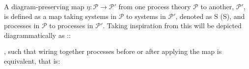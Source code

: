\documentclass[onecolum,aps,groupedaddress,nofootinbib]{revtex4-2}
\begin{document}
A diagram-preserving map \colorbox{PineGreen!20}{$\eta : \mathcal{P} \to \mathcal{P}'$} from one process theory $\mathcal{P}$ to another, $\mathcal{P}'$, is defined as a map taking
systems in $\mathcal{P}$ to systems in $\mathcal{P}'$, denoted as
\beq
S \to \eta(S),
\eeq
and processes in $\mathcal{P}$ to processes in $\mathcal{P}'$. Taking inspiration from \cite{fritz2018bimonoidal} this will be depicted diagrammatically as
\beq
\eta ::  \mapsto {}
,
\eeq
such that wiring together processes before or after applying the map is equivalent, that is:
\end{document}
